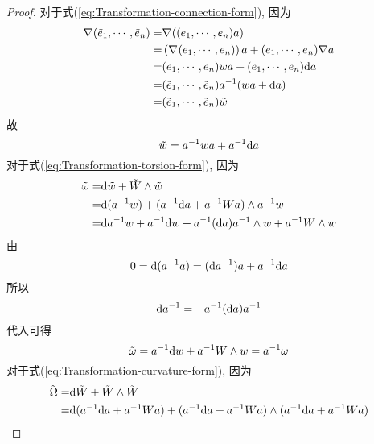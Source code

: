 \documentclass{book}
\newcommand{\md}{{\rm d}}
\newcommand{\lc}[2]{\nabla_{#1}{#2}}
\begin{document}
            \begin{proof}
                对于式(\ref{eq:Transformation-connection-form}), 因为
                \begin{align*}
                    \lc{}{(\tilde{e}_1,\cdots,\tilde{e}_n)} =& \lc{}{\left((e_1,\cdots,e_n)a\right)} \\
                    =& \left(\lc{}{(e_1,\cdots,e_n)}\right)a + (e_1,\cdots,e_n)\lc{}{a} \\
                    =& (e_1,\cdots,e_n)wa + (e_1,\cdots,e_n)\md a \\
                    =& (\tilde{e}_1,\cdots,\tilde{e}_n)a^{-1}(wa + \md a) \\
                    =& (\tilde{e}_1,\cdots,\tilde{e}_n)\tilde{w}
                \end{align*}
                故
                \begin{equation*}
                    \tilde{w} = a^{-1}wa + a^{-1}\md a
                \end{equation*}
                对于式(\ref{eq:Transformation-torsion-form}), 因为
                \begin{align*}
                    \tilde{\omega} =& \md\tilde{w} + \tilde{W}\wedge\tilde{w} \\
                    =& \md(a^{-1}w) + (a^{-1}\md a + a^{-1}Wa)\wedge a^{-1}w \\
                    =& \md a^{-1}w + a^{-1}\md w + a^{-1}(\md a)a^{-1}\wedge w + a^{-1}W\wedge w
                \end{align*}
                由
                \begin{equation*}
                    0 = \md(a^{-1}a) = (\md a^{-1})a + a^{-1}\md a
                \end{equation*}
                所以
                \begin{equation}\label{eq:da^-1}
                    \md a^{-1} = -a^{-1}(\md a)a^{-1}
                \end{equation}
                代入可得
                \begin{equation*}
                    \tilde{\omega} = a^{-1}\md w + a^{-1}W\wedge w = a^{-1}\omega
                \end{equation*}
                对于式(\ref{eq:Transformation-curvature-form}), 因为
                \begin{align*}
                    \tilde{\Omega} =& \md\tilde{W} + \tilde{W}\wedge\tilde{W} \\
                    =& \md(a^{-1}\md a + a^{-1}Wa) + (a^{-1}\md a + a^{-1}Wa)\wedge(a^{-1}\md a + a^{-1}Wa) \\

\end{align*}
\end{proof}
\end{document}
